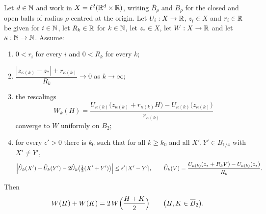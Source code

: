 \begin{lemma}
Let $d\in\mathbb{N}$ and work in $X=\ell^2(\mathbb{R}^d\times\mathbb{R})$, writing $\overline B_\rho$
and $B_\rho$ for the closed and open balls of radius $\rho$ centred at the
origin. Let $U_i:X\to\mathbb{R}$, $z_i\in X$ and $r_i\in\mathbb{R}$ be given for $i\in\mathbb{N}$, let
$R_k\in\mathbb{R}$ for $k\in\mathbb{N}$, let $z_*\in X$, let $W:X\to\mathbb{R}$ and let
$\kappa:\mathbb{N}\to\mathbb{N}$. Assume:
\begin{enumerate}
\item\label{it:blmd-pos} $0<r_i$ for every $i$ and $0<R_k$ for every $k$;
\item\label{it:blmd-slow}
$\dfrac{|z_{\kappa(k)}-z_*|+r_{\kappa(k)}}{R_k}\longrightarrow0$ as
$k\to\infty$;
\item\label{it:blmd-W} the rescalings
\[
  W_k(H)=\frac{U_{\kappa(k)}\bigl(z_{\kappa(k)}+r_{\kappa(k)}H\bigr)
    -U_{\kappa(k)}\bigl(z_{\kappa(k)}\bigr)}{r_{\kappa(k)}}
\]
converge to $W$ uniformly on $\overline B_2$;
\item\label{it:blmd-tpf} for every $\epsilon'>0$ there is $k_0$ such that for
all $k\ge k_0$ and all $X',Y'\in B_{1/4}$ with $X'\ne Y'$,
\[
  \Bigl|\widehat U_k(X')+\widehat U_k(Y')
    -2\widehat U_k\bigl(\tfrac12(X'+Y')\bigr)\Bigr|
  \le\epsilon'\,|X'-Y'| ,
  \qquad
  \widehat U_k(V)=\frac{U_{\kappa(k)}(z_*+R_kV)-U_{\kappa(k)}(z_*)}{R_k} .
\]
\end{enumerate}
Then
\begin{equation}\label{eq:blmd-mid}
  W(H)+W(K)=2\,W\Bigl(\frac{H+K}{2}\Bigr)
  \qquad\bigl(H,K\in\overline B_2\bigr).
\end{equation}
\end{lemma}
